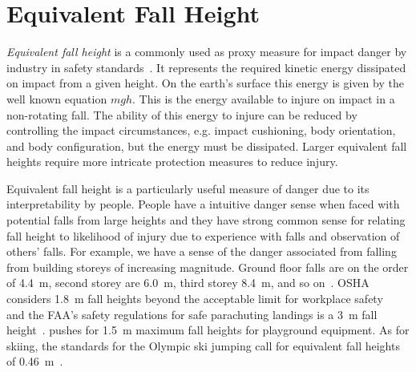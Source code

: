 \documentclass{article}
\begin{document}
\section{Equivalent Fall Height}
%
\emph{Equivalent fall height} is a commonly used as proxy measure for impact
danger by industry in safety standards~\cite{Hubbard2012}. It represents the
required kinetic energy dissipated on impact from a given height. On the
earth's surface this energy is given by the well known equation $mgh$. This is
the energy available to injure on impact in a non-rotating fall. The ability of
this energy to injure can be reduced by controlling the impact circumstances,
e.g. impact cushioning, body orientation, and body configuration, but the
energy must be dissipated. Larger equivalent fall heights require more
intricate protection measures to reduce injury.

Equivalent fall height is a particularly useful measure of danger due to its
interpretability by people. People have a intuitive danger sense when faced
with potential falls from large heights and they have strong common sense for
relating fall height to likelihood of injury due to experience with falls and
observation of others' falls. For example, we have a sense of the danger
associated from falling from building storeys of increasing magnitude. Ground
floor falls are on the order of 4.4~\si{\meter}, second storey are
6.0~\si{\meter}, third storey 8.4~\si{\meter}, and so on~\cite{Vish2005}. OSHA
considers 1.8~\si{\meter} fall heights beyond the acceptable limit for
workplace safety~ and the FAA's safety regulations for safe
parachuting landings is a 3~\si{\meter} fall height~.
\cite{Chalmers1996} pushes for 1.5~\si{\meter} maximum fall heights for
playground equipment. As for skiing, the standards for the Olympic ski jumping
call for equivalent fall heights of 0.46~\si{\meter}~.
\end{document}
